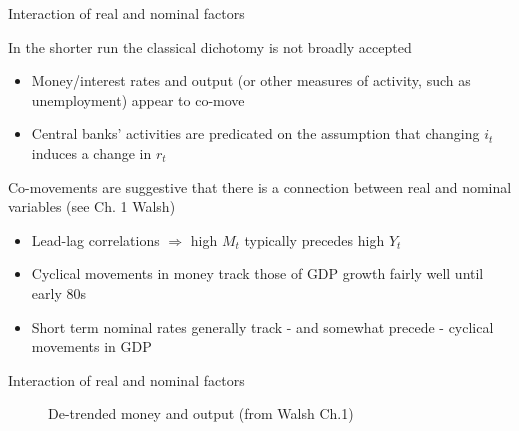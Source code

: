 \begin{frame}{Interaction of real and nominal factors}

In the shorter run the classical dichotomy is not broadly accepted
\begin{itemize}
\item 	Money/interest rates and output (or other measures of activity, such as unemployment) appear to co-move
\item	Central banks' activities are predicated on the assumption that changing $i_{t}$ induces a change in $r_{t}$
\end{itemize}

\vspace{2mm}
Co-movements are suggestive that there is a connection between real and nominal variables (see Ch. 1 Walsh)
\begin{itemize}
\item	Lead-lag correlations $\Rightarrow$ high $M_{t}$ typically precedes high $Y_{t}$
\item	Cyclical movements in money track those of GDP growth fairly well until early 80s
\item	Short term nominal rates generally track - and somewhat precede - cyclical movements in GDP
\end{itemize}
 
\end{frame}



\begin{frame}{Interaction of real and nominal factors}

\begin{figure}[!htb]
\caption{\label{fig:walsh_ch1_M_GDP} De-trended money and output (from Walsh Ch.1)}
\end{figure}
 
\end{frame}


